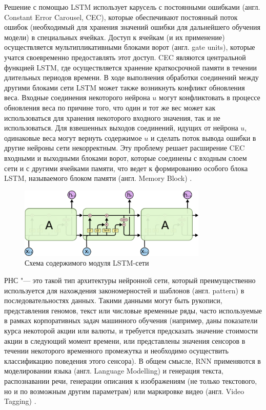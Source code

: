 \documentclass[bachelor, och, coursework]{SCWorks}
\begin{document}
        Решение с помощью LSTM использует карусель с постоянными ошибками (англ.
        Constant Error Carousel, CEC), которые обеспечивают постоянный поток
        ошибок (необходимый для хранения значений ошибки для дальнейшего
        обучения модели) в специальных ячейках. Доступ к ячейкам (и их
        применение) осуществляется мультипликативными блоками ворот (англ. gate
        units), которые учатся своевременно предоставлять этот доступ. CEC
        являются центральной функцией LSTM, где осуществляется хранение
        краткосрочной памяти в течении длительных периодов времени. В ходе
        выполнения обработки соединений между другими блоками сети LSTM может
        также возникнуть конфликт обновления веса. Входные соединения некоторого
        нейрона $u$ могут конфликтовать в процессе обновления веса по причине
        того, что один и тот же вес может как использоваться для хранения
        некоторого входного значения, так и не использоваться. Для взвешенных
        выходов соединений, идущих от нейрона $u$, одинаковые веса могут вернуть
        содержимое $u$ и сделать поток вывода ошибки в другие нейроны сети
        некорректным. Эту проблему решает расширение CEC входными и выходными
        блоками ворот, которые соединены с входным слоем сети и с другими
        ячейками памяти, что ведет к формированию особого блока LSTM,
        называемого блоком памяти (англ. Memory Block) \cite{lstm1}.

        \begin{figure}[H]
            \centering
            \includegraphics[width=0.8\textwidth]{pics/lstm.png}
            \caption{Схема содержимого модуля LSTM-сети}
        \end{figure}

        РНС "--- это такой тип архитектуры нейронной сети, который
        преимущественно используется для нахождения закономерностей и шаблонов
        (англ. pattern) в последовательностях данных. Такими данными могут быть
        рукописи, представления геномов, текст или числовые временные ряды,
        часто используемые в рамках корпоративных задач машинного обучения
        (например, даны показатели курса некоторой акции или валюты, и требуется
        предсказать значение стоимости акции в следующий момент времени, или
        представлены значения сенсоров в течении некоторого временного
        промежутка и необходимо осуществить классификацию поведения этого
        сенсора). В общем смысле, RNN применяются в моделировании языка (англ.
        Language Modelling) и генерация текста, распознавании речи, генерации
        описания к изображениям (не только текстового, но и по возможным другим
        параметрам) или маркировке видео (англ. Video Tagging) \cite{rnn2}.
        
\end{document}

